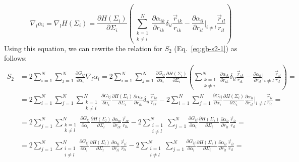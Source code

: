 \documentclass[11pt]{book}
\begin{document}
\begin{equation}\label{eq:gb-gradalpha}
\nabla_{l}\alpha_{i}=\nabla_{l}H(\Sigma_{i})=\frac{\partial H(\Sigma_{i})}{\partial \Sigma_{i}}\left(\sum_{\substack{k=1\\k\ne i}}^{N}\frac{\partial \alpha_{ik}}{\partial r_{ik}}\delta_{il}\frac{\vec{r}_{ik}}{r_{ik}}-\frac{\partial \alpha_{il}}{\partial r_{il}}\bigg|_{i\ne l}\frac{\vec{r}_{il}}{r_{il}}\right)
\end{equation}
Using this equation, we can rewrite the relation for $S_{2}$ (Eq.~\ref{eq:gb-s2-1}) as follows:
\begin{equation}\label{eq:gb-s2-2}
\begin{split}
S_{2}&=2\sum_{i=1}^{N}\sum_{j=1}^{N}\frac{\partial G_{ij}}{\partial \alpha_{i}}\nabla_{l}\alpha_{i}=2\sum_{i=1}^{N}\sum_{j=1}^{N}\frac{\partial G_{ij}}{\partial \alpha_{i}}\frac{\partial H(\Sigma_{i})}{\partial \Sigma_{i}}\left(\sum_{\substack{k=1\\k\ne i}}^{N}\frac{\partial \alpha_{ik}}{\partial r_{ik}}\delta_{il}\frac{\vec{r}_{ik}}{r_{ik}}-\frac{\partial \alpha_{il}}{\partial r_{il}}\bigg|_{i\ne l}\frac{\vec{r}_{il}}{r_{il}}\right)=\\
&=2\sum_{i=1}^{N}\sum_{j=1}^{N}\sum_{\substack{k=1\\k\ne i}}^{N}\frac{\partial G_{ij}}{\partial \alpha_{i}}\frac{\partial H(\Sigma_{i})}{\partial \Sigma_{i}}\frac{\partial \alpha_{ik}}{\partial r_{ik}}\delta_{il}\frac{\vec{r}_{ik}}{r_{ik}}-2\sum_{i=1}^{N}\sum_{j=1}^{N}\frac{\partial G_{ij}}{\partial \alpha_{i}}\frac{\partial H(\Sigma_{i})}{\partial \Sigma_{i}}\frac{\partial \alpha_{il}}{\partial r_{il}}\bigg|_{i\ne l}\frac{\vec{r}_{il}}{r_{il}}=\\
&=2\sum_{j=1}^{N}\sum_{\substack{k=1\\k\ne l}}^{N}\frac{\partial G_{lj}}{\partial \alpha_{l}}\frac{\partial H(\Sigma_{l})}{\partial \Sigma_{l}}\frac{\partial \alpha_{lk}}{\partial r_{lk}}\frac{\vec{r}_{lk}}{r_{lk}}-2\sum_{\substack{i=1\\i\ne l}}^{N}\sum_{j=1}^{N}\frac{\partial G_{ij}}{\partial \alpha_{i}}\frac{\partial H(\Sigma_{i})}{\partial \Sigma_{i}}\frac{\partial \alpha_{il}}{\partial r_{il}}\frac{\vec{r}_{il}}{r_{il}}=\\
&=2\sum_{j=1}^{N}\sum_{\substack{i=1\\i\ne l}}^{N}\frac{\partial G_{lj}}{\partial \alpha_{l}}\frac{\partial H(\Sigma_{l})}{\partial \Sigma_{l}}\frac{\partial \alpha_{li}}{\partial r_{li}}\frac{\vec{r}_{li}}{r_{li}}-2\sum_{\substack{i=1\\i\ne l}}^{N}\sum_{j=1}^{N}\frac{\partial G_{ij}}{\partial \alpha_{i}}\frac{\partial H(\Sigma_{i})}{\partial \Sigma_{i}}\frac{\partial \alpha_{il}}{\partial r_{il}}\frac{\vec{r}_{il}}{r_{il}}=\\

\end{split}
\end{equation}
\end{document}
